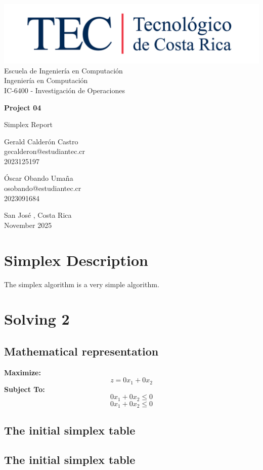 \documentclass[12pt,a4paper]{report}
\makeatletter
\def \unidad{Escuela de Ingeniería en Computación}
\def \programa{Ingeniería en Computación}
\def \curso{IC-6400 - Investigación de Operaciones}
\def \titulo{Project 04}
\def \subtitulo{Simplex Report}
\def \autores{
    Gerald Calderón Castro\\
    gecalderon@estudiantec.cr\\
    2023125197\\

    \vspace{0.5cm}

    Óscar Obando Umaña\\
    osobando@estudiantec.cr\\
    2023091684
}
\def \fecha{November 2025}
\def \lugar{San José , Costa Rica}
\makeatother
\begin{document}
\begin{titlepage}
    \begin{center}
        \vspace*{1cm}

        \includegraphics[width=0.8\linewidth]{logo_tec.jpg}\\

        \LARGE
        \unidad\\
        \programa\\
        \curso

        \vspace{1cm}

        \Huge
        \textbf{\titulo}

        \vspace{0.5cm}
        \LARGE
        \subtitulo

        \vspace{1.5cm}

        \large
        \autores

        \vfill

        \lugar\\
        \fecha

    \end{center}
\end{titlepage}
\tableofcontents

\chapter{Simplex Description}
The simplex algorithm is a very simple algorithm.
\chapter{Solving 2}
\section{Mathematical representation}
\textbf{Maximize:}
\begin{dmath}
z = 0x_{1} + 0x_{2} 
\end{dmath}
\textbf{Subject To:}
\begin{dmath}
0x_{1} + 0x_{2} \leq0
\end{dmath}
\begin{dmath}
0x_{1} + 0x_{2} \leq0
\end{dmath}
\section{The initial simplex table}
\section{The initial simplex table}
\end{document}
